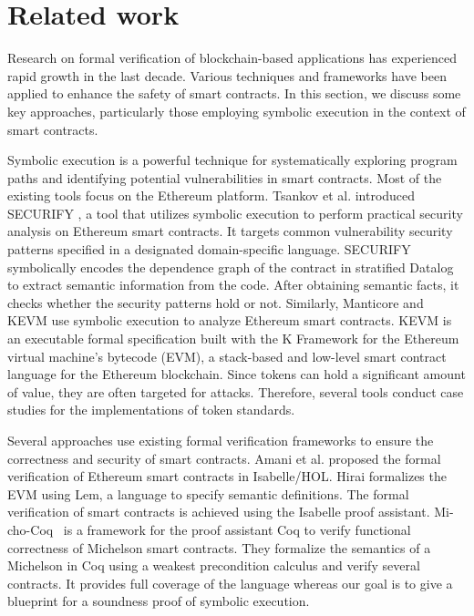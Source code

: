 \section{Related work}
\label{sec:related-work}

Research on formal verification of blockchain-based applications
has experienced rapid growth in the last decade. Various techniques
and frameworks have been applied to enhance the safety of smart
contracts. In this section, we 
discuss some key approaches, particularly those employing symbolic
execution in the context of smart contracts. 
 
Symbolic execution is a powerful technique for
systematically exploring program paths and identifying potential
vulnerabilities in smart contracts. Most of the existing tools focus
on the Ethereum platform. Tsankov et al. introduced
SECURIFY \cite{securify}, a tool that utilizes symbolic execution to
perform practical security analysis on Ethereum smart contracts. It
targets common vulnerability security patterns specified in a
designated domain-specific language. SECURIFY symbolically encodes the
dependence graph of the contract in stratified Datalog to extract
semantic information from the code. After obtaining semantic facts, it
checks whether the security patterns hold or not. Similarly, Manticore
\cite{manticore} and KEVM \cite{kevm} use symbolic execution to
analyze Ethereum smart contracts. KEVM is an executable formal
specification built with the K Framework for the Ethereum virtual
machine's bytecode (EVM), a stack-based and low-level smart contract
language for the Ethereum blockchain. Since tokens can hold a
significant amount of value, they are often targeted for
attacks. Therefore, several tools \cite{kevm,park} conduct case
studies for the implementations of token standards. 

Several approaches use existing formal verification frameworks to
ensure the correctness and security of smart contracts. Amani et
al. \cite{isabelle} proposed the formal verification of Ethereum smart
contracts in Isabelle/HOL. Hirai \cite{hirai} formalizes the EVM using
Lem, a language to specify semantic definitions. The formal
verification of smart contracts is achieved using the Isabelle proof
assistant. 
Mi-cho-Coq~\cite{mi-cho-coq} is a framework for the proof assistant Coq to verify
functional correctness of Michelson smart contracts. They formalize
the semantics of a Michelson in Coq using a weakest precondition
calculus and verify several contracts.
It provides full coverage of the language whereas our goal is to give
a blueprint for a soundness proof of symbolic execution.

